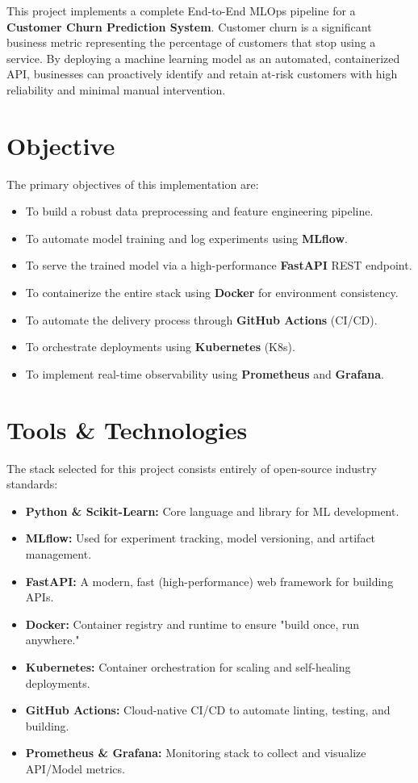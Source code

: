 \documentclass[12pt,a4paper]{article}
\begin{document}
This project implements a complete End-to-End MLOps pipeline for a \textbf{Customer Churn Prediction System}. Customer churn is a significant business metric representing the percentage of customers that stop using a service. By deploying a machine learning model as an automated, containerized API, businesses can proactively identify and retain at-risk customers with high reliability and minimal manual intervention.

\section{Objective}
The primary objectives of this implementation are:
\begin{itemize}
    \item To build a robust data preprocessing and feature engineering pipeline.
    \item To automate model training and log experiments using \textbf{MLflow}.
    \item To serve the trained model via a high-performance \textbf{FastAPI} REST endpoint.
    \item To containerize the entire stack using \textbf{Docker} for environment consistency.
    \item To automate the delivery process through \textbf{GitHub Actions} (CI/CD).
    \item To orchestrate deployments using \textbf{Kubernetes} (K8s).
    \item To implement real-time observability using \textbf{Prometheus} and \textbf{Grafana}.
\end{itemize}

\section{Tools \& Technologies}
The stack selected for this project consists entirely of open-source industry standards:
\begin{itemize}
    \item \textbf{Python & Scikit-Learn:} Core language and library for ML development.
    \item \textbf{MLflow:} Used for experiment tracking, model versioning, and artifact management.
    \item \textbf{FastAPI:} A modern, fast (high-performance) web framework for building APIs.
    \item \textbf{Docker:} Container registry and runtime to ensure "build once, run anywhere."
    \item \textbf{Kubernetes:} Container orchestration for scaling and self-healing deployments.
    \item \textbf{GitHub Actions:} Cloud-native CI/CD to automate linting, testing, and building.
    \item \textbf{Prometheus & Grafana:} Monitoring stack to collect and visualize API/Model metrics.
\end{itemize}
\end{document}
